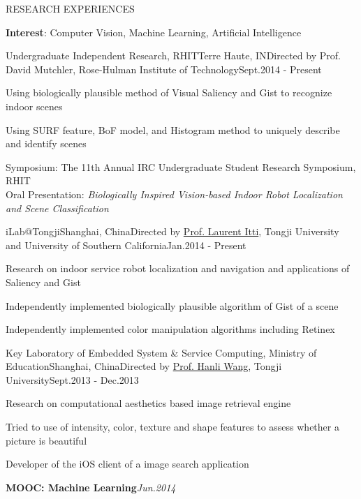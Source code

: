 \documentclass{resume} %
\begin{document}
\begin{rSection}{RESEARCH EXPERIENCES}

  {\bf Interest}: Computer Vision, Machine Learning, Artificial Intelligence \vspace{0.5em}

  \begin{rSubsection}{Undergraduate Independent Research, RHIT}{Terre Haute, IN}{Directed by Prof. David
    Mutchler, Rose-Hulman Institute of Technology}{Sept.2014 - Present}
  \item Using biologically plausible method of Visual Saliency and Gist to recognize indoor scenes
  \item Using SURF feature, BoF model, and Histogram method to uniquely describe and identify scenes
  \item Symposium: The 11th Annual IRC Undergraduate Student Research Symposium, RHIT \\
    \hspace{\labelwidth}Oral Presentation: {\em Biologically Inspired Vision-based Indoor Robot Localization and Scene Classification}
  \end{rSubsection}


  \begin{rSubsection}{iLab@Tongji}{Shanghai, China}{Directed by
      \href{http://ilab.usc.edu/itti/}{Prof. Laurent Itti}, Tongji
    University and University of Southern California}{Jan.2014 - Present}
  \item Research on indoor service robot localization and navigation and applications of Saliency and Gist
  \item Independently implemented biologically plausible algorithm of Gist of a scene
  \item Independently implemented color manipulation algorithms including Retinex
  \end{rSubsection}


  \begin{rSubsection}{ Key Laboratory of Embedded System \& Service Computing, Ministry of Education}{Shanghai, China}{Directed by
\href{http://www.tongji.edu.cn/~hanliwang/}{Prof. Hanli Wang}, Tongji University}{Sept.2013 - Dec.2013}
  \item Research on computational aesthetics based image retrieval engine
  \item Tried to use of intensity, color, texture and shape features to assess whether a picture is beautiful
  \item Developer of the iOS client of a image search application
  \end{rSubsection}

  {\bf MOOC: Machine Learning}\hfill{\em Jun.2014}

\end{rSection}
\end{document}

